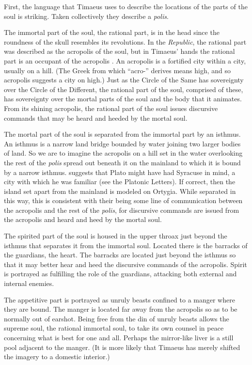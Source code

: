 First, the language that Timaeus uses to describe the locations of the parts of the soul is striking. Taken collectively they describe a \emph{polis}. 

The immortal part of the soul, the rational part, is in the head since the roundness of the skull resembles its revolutions. In the \emph{Republic}, the rational part was described as the acropolis of the soul, but in Timaeus' hands the rational part is an occupant of the acropolis \citep[81]{Price:1995hc}. An acropolis is a fortified city within a city, usually on a hill. (The Greek from which ``acro-'' derives means high, and so acropolis suggests a city on high.) Just as the Circle of the Same has sovereignty over the Circle of the Different, the rational part of the soul, comprised of these, has sovereignty over the mortal parts of the soul and the body that it animates. From its shining acropolis, the rational part of the soul issues discursive commands that may be heard and heeded by the mortal soul.

The mortal part of the soul is separated from the immortal part by an isthmus. An isthmus is a narrow land bridge bounded by water joining two larger bodies of land. So we are to imagine the acropolis on a hill set in the water overlooking the rest of the \emph{polis} spread out beneath it on the mainland to which it is bound by a narrow isthmus. \citet[500]{Taylor:1928qb} suggests that Plato might have had Syracuse in mind, a city with which he was familiar (see the Platonic Letters). If correct, then the island set apart from the mainland is modeled on Ortygia. While separated in this way, this is consistent with their being some line of communication between the acropolis and the rest of the \emph{polis}, for discursive commands are issued from the acropolis and heard and heed by the mortal soul. 

The spirited part of the soul is housed in the upper throax just beyond the isthmus that separates it from the immortal soul. Located there is the barracks of the guardians, the heart. The barracks are located just beyond the isthmus so that it may better hear and heed the discursive commands of the acropolis. Spirit is portrayed as fulfilling the role of the guardians, attacking both external and internal enemies.

The appetitive part is portrayed as unruly beasts confined to a manger where they are bound. The manger is located far away from the acropolis so as to be normally out of earshot. Being free from the din of unruly beasts allows the supreme soul, the rational immortal soul, to take its own counsel in peace concerning what is best for one and all. Perhaps the mirror-like liver is a still pool adjacent to the manger. (It is more likely that Timaeus has merely shifted the imagery to a domestic interior.)

